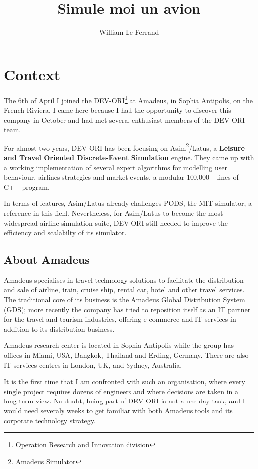 \documentclass[11pt]{JHEP3}
\title{Simule moi un avion}
\author{William Le Ferrand}
\begin{document}
\maketitle 
\newpage

\section{Context}

The 6th of April I joined the DEV-ORI\footnote{Operation Research and
  Innovation division} at Amadeus, in Sophia Antipolis, on the French
Riviera. I came here because I had the opportunity to discover this
company in October and had met several enthusiast members of the
DEV-ORI team.

For almost two years, DEV-ORI has been focusing on
Asim\footnote{Amadeus Simulator}/Latus, a \textbf{Leisure and Travel
  Oriented Discrete-Event Simulation} engine. They came up with a
working implementation of several expert algorithms for modelling user
behaviour, airlines strategies and market events, a modular 100,000+
lines of C++ program.

In terms of features, Asim/Latus already challenges PODS, the MIT
simulator, a reference in this field. Nevertheless, for Asim/Latus to
become the most widespread airline simulation suite, DEV-ORI still
needed to improve the efficiency and scalabilty of its simulator.

\subsection{About Amadeus}

Amadeus specialises in travel technology solutions to facilitate the
distribution and sale of airline, train, cruise ship, rental car,
hotel and other travel services. The traditional core of its business
is the Amadeus Global Distribution System (GDS); more recently the
company has tried to reposition itself as an IT partner for the travel
and tourism industries, offering e-commerce and IT services in
addition to its distribution business.

Amadeus research center is located in Sophia Antipolis while the group
has offices in Miami, USA, Bangkok, Thailand and Erding,
Germany. There are also IT services centres in London, UK, and Sydney,
Australia.

It is the first time that I am confronted with such an organisation,
where every single project requires dozens of engineers and where
decisions are taken in a long-term view. No doubt, being part of
DEV-ORI is not a one day task, and I would need severaly weeks to get
familiar with both Amadeus tools and its corporate technology strategy.
\end{document}
